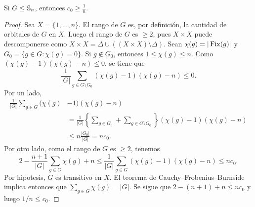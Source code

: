 \begin{theorem}
Si $G\leq\mathbb{S}_n$, entonces $c_0\geq\frac{1}{n}$.
\end{theorem}

\begin{proof}
Sea $X=\{1,\dots,n\}$. El rango de $G$ es, por definición, la cantidad de orbitales de $G$ en $X$. Luego 
el rango de $G$ es $\geq2$, pues $X\times X$ puede descomponerse como 
$X\times X=\Delta\cup\left((X\times X)\setminus\Delta\right)$. 
Sean $\chi(g)=|\operatorname{Fix}(g)|$ y $G_0=\{g\in G:\chi(g)=0\}$. Si $g\not\in G_0$, entonces $1\leq\chi(g)\leq n$. Como 
$(\chi(g)-1)(\chi(g)-n)\leq 0$,
se tiene que 
\[
\frac{1}{|G|}\sum_{g\in G\setminus G_0}(\chi(g)-1)(\chi(g)-n)\leq 0.
\]
Por un lado, 
\begin{align*}
\frac{1}{|G|}\sum_{g\in G}(\chi(g)&-1)(\chi(g)-n)\\
&=\frac{1}{|G|}\left\{\sum_{g\in G_0}+\sum_{g\in G\setminus G_0}\right\}(\chi(g)-1)(\chi(g)-n)\\
&\leq n\frac{|G_0|}{|G|}=nc_0.
\end{align*}
Por otro lado, como el rango de $G$ es $\geq2$, tenemos 
\begin{equation}
    \label{eq:CameronCohen}
    2-\frac{n+1}{|G|}\sum_{g\in G}\chi(g)+n\leq 
    \frac{1}{|G|}\sum_{g\in G}(\chi(g)-1)(\chi(g)-n)\leq nc_0.
\end{equation}
Por hipotesis, $G$ es transitivo en $X$. El teorema de Cauchy--Frobenius--Burnside implica entonces que 
$\sum_{g\in G}\chi(g)=|G|$. Se sigue que $2-(n+1)+n\leq nc_0$ y luego $1/n\leq c_0$. 
\end{proof}

